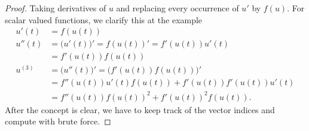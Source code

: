 
\begin{proof}
  Taking derivatives of $u$ and replacing every occurrence of $u'$ by
  $f(u)$. For scalar valued functions, we clarify this at the example
  \begin{align*}
    u'(t) &= f(u(t)) \\
    u''(t) &= \bigl(u'(t)\bigr)'
    = f(u(t))' = f'(u(t))u'(t)
    \\& = f'(u(t)) f(u(t))
    \\
    u^{(3)} &= \bigl(u''(t)\bigr)' = \bigl(f'(u(t)) f(u(t))\bigr)'
    \\&= f''(u(t)) u'(t) f(u(t)) + f'(u(t)) f'(u(t)) u'(t)
    \\& = f''(u(t)) f(u(t))^2 + f'(u(t))^2 f(u(t)).
  \end{align*}
  After the concept is clear, we have to keep track of the vector
  indices and compute with brute force.
\end{proof}



